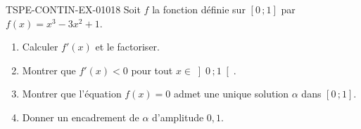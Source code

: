 \begin{exercice}{TSPE-CONTIN-EX-010}{1}{8}
Soit $f$ la fonction définie sur $[0\,;1]$ par $f(x) = x^3 - 3x^2 + 1$.
\begin{enumerate}
  \item Calculer $f'(x)$ et le factoriser.
  \item Montrer que $f'(x) < 0$ pour tout $x \in \left]0\,;1\right[$.
  \item Montrer que l'équation $f(x) = 0$ admet une unique solution $\alpha$ dans $[0\,;1]$.
  \item Donner un encadrement de $\alpha$ d'amplitude $0{,}1$.
\end{enumerate}
\end{exercice}
